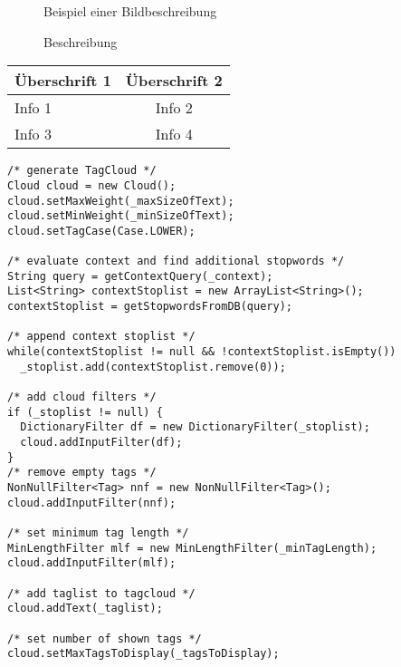 \begin{figure}[htb]
 \centering
 \caption[Beispiel einer Bildbeschreibung]{Beispiel einer Bildbeschreibung\footnotemark}
\label{fig:beispiel1}
\end{figure}

\begin{figure}[htb]
 \centering
 \caption[Beschreibung]{Beschreibung}
\label{fig:Beschreibung}
\end{figure}


\begin{center}
  \begin{tabular}{ | l | c | }
    \hline
    Überschrift 1 & Überschrift 2 \\ \hline \hline
    Info 1 & Info 2 \\ \hline
    Info 3 & Info 4 \\
    \hline
  \end{tabular}
\end{center}



\lstset{language=java}
\begin{lstlisting}[frame=htrbl, caption={Das Listing zeigt Java Quellcode}, label={lst:result2}]
/* generate TagCloud */
Cloud cloud = new Cloud();
cloud.setMaxWeight(_maxSizeOfText);
cloud.setMinWeight(_minSizeOfText);
cloud.setTagCase(Case.LOWER);
	    
/* evaluate context and find additional stopwords */
String query = getContextQuery(_context);
List<String> contextStoplist = new ArrayList<String>();
contextStoplist = getStopwordsFromDB(query);
	    
/* append context stoplist */
while(contextStoplist != null && !contextStoplist.isEmpty())
  _stoplist.add(contextStoplist.remove(0));
	    
/* add cloud filters */
if (_stoplist != null) {
  DictionaryFilter df = new DictionaryFilter(_stoplist);
  cloud.addInputFilter(df);
}
/* remove empty tags */
NonNullFilter<Tag> nnf = new NonNullFilter<Tag>();
cloud.addInputFilter(nnf);

/* set minimum tag length */
MinLengthFilter mlf = new MinLengthFilter(_minTagLength);
cloud.addInputFilter(mlf);

/* add taglist to tagcloud */
cloud.addText(_taglist);

/* set number of shown tags */	    
cloud.setMaxTagsToDisplay(_tagsToDisplay);
\end{lstlisting}


